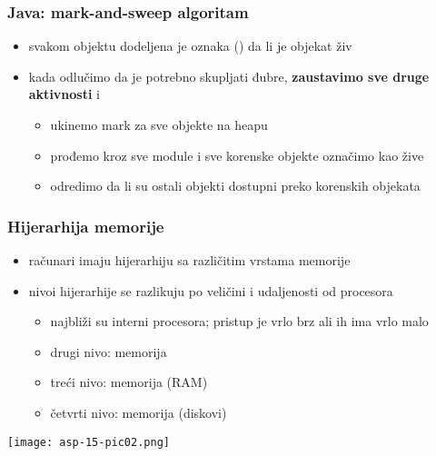 \documentclass[compress,aspectratio=169]{beamer}
\begin{document}
\begin{frame}[fragile]
  \frametitle{Java: mark-and-sweep algoritam}
  \begin{itemize}
    \item svakom objektu dodeljena je oznaka () da li je
    objekat živ
    \item kada odlučimo da je potrebno skupljati đubre, \textbf{zaustavimo sve
    druge aktivnosti} i 
    \begin{itemize}
      \item ukinemo mark za sve objekte na heapu
      \item prođemo kroz sve module i sve korenske objekte označimo kao žive
      \item odredimo da li su ostali objekti dostupni preko korenskih objekata \\ 
    \end{itemize}
  \end{itemize}
\end{frame}

\begin{frame}[fragile]
  \frametitle{Hijerarhija memorije}
  \begin{itemize}
    \item računari imaju hijerarhiju sa različitim vrstama memorije
    \item nivoi hijerarhije se razlikuju po veličini i udaljenosti od procesora
    \begin{itemize}
      \item najbliži su interni  procesora; pristup je vrlo brz ali ih ima vrlo malo
      \item drugi nivo:  memorija
      \item treći nivo:  memorija (RAM)
      \item četvrti nivo:  memorija (diskovi)
    \end{itemize}
  \end{itemize}
  \begin{center}
    \texttt{[image: asp-15-pic02.png]}
  \end{center}
\end{frame}
\end{document}
